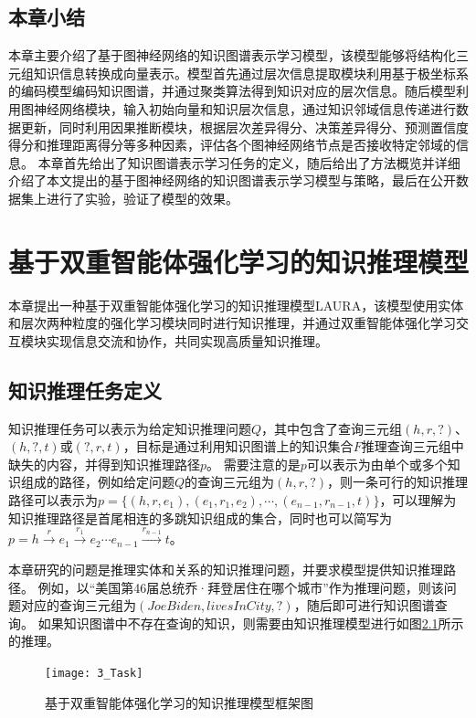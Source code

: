 \documentclass[algorithmlist, AutoFakeBold, AutoFakeSlant, figurelist, tablelist, nomlist, engineering]{seuthesix}
\begin{document}
\section{本章小结}
本章主要介绍了基于图神经网络的知识图谱表示学习模型，该模型能够将结构化三元组知识信息转换成向量表示。模型首先通过层次信息提取模块利用基于极坐标系的编码模型编码知识图谱，并通过聚类算法得到知识对应的层次信息。随后模型利用图神经网络模块，输入初始向量和知识层次信息，通过知识邻域信息传递进行数据更新，同时利用因果推断模块，根据层次差异得分、决策差异得分、预测置信度得分和推理距离得分等多种因素，评估各个图神经网络节点是否接收特定邻域的信息。
本章首先给出了知识图谱表示学习任务的定义，随后给出了方法概览并详细介绍了本文提出的基于图神经网络的知识图谱表示学习模型与策略，最后在公开数据集上进行了实验，验证了模型的效果。


\chapter{基于双重智能体强化学习的知识推理模型}
本章提出一种基于双重智能体强化学习的知识推理模型LAURA，该模型使用实体和层次两种粒度的强化学习模块同时进行知识推理，并通过双重智能体强化学习交互模块实现信息交流和协作，共同实现高质量知识推理。

\section{知识推理任务定义}
知识推理任务可以表示为给定知识推理问题$Q$，其中包含了查询三元组$(h, r, ?)$、$(h, ?, t)$或$(?, r, t)$，目标是通过利用知识图谱上的知识集合$F$推理查询三元组中缺失的内容，并得到知识推理路径$p$。
需要注意的是$p$可以表示为由单个或多个知识组成的路径，例如给定问题$Q$的查询三元组为$(h, r, ?)$，则一条可行的知识推理路径可以表示为$p=\{(h, r, e_1), (e_1, r_1, e_2), \cdots, (e_{n-1}, r_{n-1}, t)\}$，可以理解为知识推理路径是首尾相连的多跳知识组成的集合，同时也可以简写为$p=h\xrightarrow{r}e_1\xrightarrow{r_1}e_2 \cdots e_{n-1}\xrightarrow{r_{n-1}}t$。

本章研究的问题是推理实体和关系的知识推理问题，并要求模型提供知识推理路径。
例如，以“美国第46届总统乔·拜登居住在哪个城市”作为推理问题，则该问题对应的查询三元组为$(Joe Biden, livesInCity, ?)$，随后即可进行知识图谱查询。
如果知识图谱中不存在查询的知识，则需要由知识推理模型进行如图\ref{3_Task}所示的推理。
\begin{figure}[ht]
  \centering
  \texttt{[image: 3\_Task]}
  \caption{基于双重智能体强化学习的知识推理模型框架图}
  \label{3_Task}
\end{figure}
\end{document}

